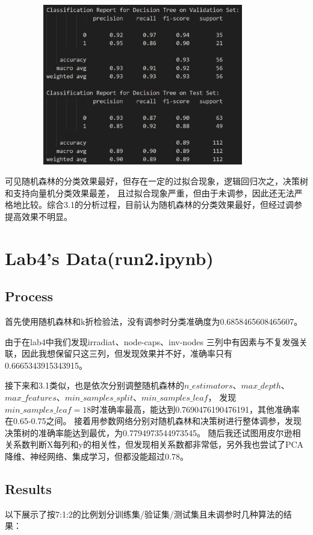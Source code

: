 \documentclass{ctexart}
\begin{document}
			\begin{figure}[H]
				\centering 
				\includegraphics[height=7cm,width=10cm]{4.png}
				\end{figure}
可见随机森林的分类效果最好，但存在一定的过拟合现象，逻辑回归次之，决策树和支持向量机分类效果最差，
且过拟合现象严重，但由于未调参，因此还无法严格地比较。综合3.1的分析过程，目前认为随机森林的分类效果最好，但经过调参提高效果不明显。

    \section{Lab4's Data(run2.ipynb)}
    \subsection{Process}
	首先使用随机森林和k折检验法，没有调参时分类准确度为0.6858465608465607。
	
	由于在lab4中我们发现irradiat、node-caps、inv-nodes
	三列中有因素与不复发强关联，因此我想保留只这三列，但发现效果并不好，准确率只有0.6665343915343915。

	接下来和3.1类似，也是依次分别调整随机森林的$n\_estimators$、$max\_depth$、$max\_features$、$min\_samples\_split$、$min\_samples\_leaf$，
	发现$min\_samples\_leaf=18$时准确率最高，能达到0.7690476190476191，其他准确率在0.65-0.75之间。
	接着用参数网络分别对随机森林和决策树进行整体调参，发现决策树的准确率能达到最优，为0.7794973544973545。
	随后我还试图用皮尔逊相关系数判断X每列和y的相关性，但发现相关系数都非常低，另外我也尝试了PCA降维、神经网络、集成学习，但都没能超过0.78。
	\subsection{Results}
以下展示了按7:1:2的比例划分训练集/验证集/测试集且未调参时几种算法的结果：
\end{document}

